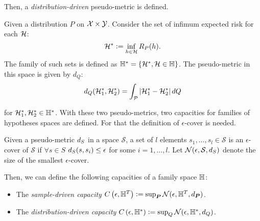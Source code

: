 Then, a \emph{distribution-driven} pseudo-metric is defined. 
\begin{definition}
    \label{def:dist_pseudometric}
    Given a distribution $P$ on $\mathcal{X} \times \mathcal{Y}$. Consider the set of infimum expected risk for each $\mathcal{H}$:
\begin{equation}
    \nonumber
    \mathcal{H}^* \vcentcolon= \inf_{h \in \mathcal{H}} R_P(h).
\end{equation}
The family of such sets is defined as 
$\mathbb{H}^{*} = \left\{\mathcal{H}^*, \mathcal{H} \in \mathbb{H}\right\}$.
The pseudo-metric in this space is given by $d_Q$:
\begin{equation}
    \nonumber
    d_{Q}(\mathcal{H}_1^*, \mathcal{H}_2^*) = \int_{\mathcal{P}} \left|\mathcal{H}_1^* - \mathcal{H}_2^*\right| dQ
\end{equation}
\end{definition}
for $\mathcal{H}_1^*, \mathcal{H}_2^* \in \mathbb{H}^*$.
With these two pseudo-metrics, two capacities for families of hypotheses spaces are defined. For that the definition of $\epsilon$-cover is needed. 
\begin{definition}
    \label{def:epsilon_cover}
    Given a pseudo-metric $d_{S}$ in a space $\mathcal{S}$, 
a set of $l$ elements $s_1, \ldots, s_l \in \mathcal{S}$ is an $\epsilon$-cover of $\mathcal{S}$ if 
$ \forall s \in S$ $d_{S}(s, s_i) \leq \epsilon $
for some $i=1, \ldots, l$.  Let $\mathcal{N}(\epsilon, \mathcal{S}, d_{S})$ denote the size of the smallest $\epsilon$-cover.
\end{definition}
%
Then, we can define the following capacities of a family space $\mathbb{H}$:
\begin{itemize}
    \item The \emph{sample-driven capacity} $C\left(\epsilon, \mathbb{H}^{T}\right) \vcentcolon= \sup_{\bm{P}} \mathcal{N}(\epsilon, \mathbb{H}^T, d_{\bm{P}})$.
    \item The \emph{distribution-driven capacity} $C\left(\epsilon, \mathbb{H}^{*}\right) \vcentcolon= \sup_Q \mathcal{N}(\epsilon, \mathbb{H}^{*}, d_{Q})$.
\end{itemize}

